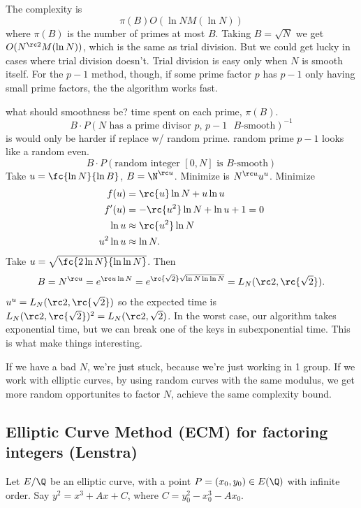 The complexity is
\[
\pi(B)O(\ln N M(\ln N))
\]
where $\pi(B)$ is the  number of primes at most $B$. 
Taking $B=\sqrt N$ we get $O(N^{\rc 2}M(\ln N))$, which is the same as trial division. But we could get lucky in cases where trial division doesn't. Trial division is easy only when $N$ is smooth itself. For the $p-1$ method, though, if some prime factor $p$ has $p-1$ only having small prime factors, the the algorithm works fast.

what should smoothness be?
time spent on each prime, $\pi(B)$. %
\[B\cdot P(N\text{ has a prime divisor $p$, $p-1$ $B$-smooth})^{-1}\]
is would only be harder if replace w/ random prime.  random prime $p-1$ looks like a random even.
\[B\cdot P(\text{random integer $[0,N]$ is $B$-smooth})\]
Take $u=\fc{\ln N}{\ln B}$, $B=\N^{\rc u}$. Minimize is $N^{\rc u}u^u$. Minimize
\begin{align*}
f(u)&=\rc{u} \ln N+u\ln u\\
f'(u)&=-\rc{u^2}\ln N+\ln u+1=0\\
\ln u&\approx\rc{u^2}\ln N\\
u^2\ln u & \approx \ln N.
\end{align*}
Take $u=\sqrt{\fc{2\ln N}{\ln\ln N}}$. Then
\[
B=N^{\rc u} = e^{\rc u\ln N}
=e^{\rc{\sqrt{2}}\sqrt{\ln N\ln\ln N}}
=L_N(\rc 2,\rc{\sqrt2}).
\]
$u^u=L_N(\rc 2,\rc{\sqrt 2})$ so the expected time is $L_N(\rc 2,\rc{\sqrt 2})^2 = L_N(\rc 2,\sqrt 2)$. 
In the worst case, our algorithm takes exponential time, but we can break one of the keys in subexponential time. This is what make things interesting.

If we have a bad $N$, we're just stuck, because we're just working in 1 group. If we work with elliptic curves, by using random curves with the same modulus, we get more random opportunites to factor $N$, achieve the same complexity bound.
\subsection{Elliptic Curve Method (ECM) for factoring integers (Lenstra)}
Let $E/\Q$ be an elliptic curve, with a point $P=(x_0,y_0)\in E(\Q)$ with infinite order. Say $y^2=x^3+Ax+C$, where $C=y_0^2-x_0^3-Ax_0$. 

